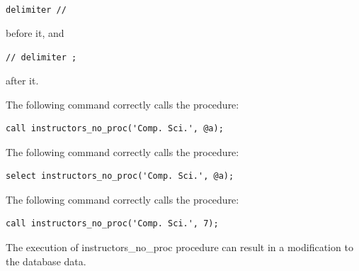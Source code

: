 \documentclass[12pt, addpoints, answers]{exam}
\begin{document}
\begin{questions}
\begin{minipage}{\linewidth}
{\texttt{delimiter //} 

before it, and 

\texttt{// delimiter ;}

after it.}

\par\vspace{0.5em}

\begin{checkboxes}
    \CorrectChoice The following command correctly calls the procedure:
    \begin{verbatim}
call instructors_no_proc('Comp. Sci.', @a);
    \end{verbatim}

    \choice The following command correctly calls the procedure:
    \begin{verbatim}
select instructors_no_proc('Comp. Sci.', @a);
    \end{verbatim}

    \choice The following command correctly calls the procedure:
    \begin{verbatim}
call instructors_no_proc('Comp. Sci.', 7);
    \end{verbatim}

    \choice The execution of instructors\_no\_proc procedure can result in a modification to the database data.
\end{checkboxes}
\end{minipage}\vspace{1em}


\end{questions}
\end{document}
